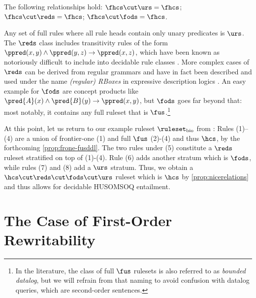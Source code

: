 \begin{corollary}\label{prop:nicerelations}
The following relationships hold:
$\fhcs \cut \urs = \fhcs$;
$\fhcs \cut \reds = \fhcs$;
$\fhcs \cut \fods = \fhcs$. 
\end{corollary}


Any set of full rules where all rule heads contain only unary predicates is  $\urs$.
The $\reds$ class includes transitivity rules of the form $\ppred(x,y) \wedge \ppred(y,z) \to \ppred(x,z)$, which have been known as notoriously difficult to include into decidable rule classes \cite{BagetBMR15,GanzingerMV99,KieronskiR21,SzwastT04}.
More complex cases of $\reds$ can be derived from regular grammars and have in fact been described and used under the name \emph{(regular) RBoxes} in expressive description logics \cite{SROIQ}.
An easy example for $\fods$ are concept products \cite{BourhisMP17,RudolphKH08} like $\pred{A}(x) \wedge \pred{B}(y) \to \ppred(x,y)$, but $\fods$ goes far beyond that: most notably, it contains any full ruleset that is $\fus$.\footnote{In the literature, the class of full $\fus$ rulesets is also referred to as \emph{bounded datalog}, but we will refrain from that naming to avoid confusion with datalog queries, which are second-order sentences.} 


\begin{example}\label{ex:Rbio-good}
At this point, let us return to our example ruleset $\ruleset_\mathrm{bio}$ from : Rules (1)–(4) are a union of frontier-one (1) and full $\fus$ (2)-(4) and thus $\hcs$, by the forthcoming \cref{prop:frone-fusddl}. The two rules under (5) constitute a $\reds$ ruleset stratified on top of (1)-(4). Rule (6) adds another stratum which is $\fods$, while rules (7) and (8) add a $\urs$ stratum. Thus, we obtain a $\hcs \cut \reds \cut \fods \cut \urs$ ruleset which is $\hcs$ by \cref{prop:nicerelations} and thus allows for decidable HUSOMSOQ entailment.  
\end{example}

\section{The Case of First-Order Rewritability}\label{sec:FO-rewritability}


